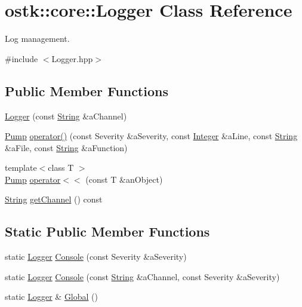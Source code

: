 \hypertarget{classostk_1_1core_1_1_logger}{}\section{ostk\+:\+:core\+:\+:Logger Class Reference}
\label{classostk_1_1core_1_1_logger}


Log management.  




{\ttfamily \#include $<$Logger.\+hpp$>$}

\subsection*{Public Member Functions}
\begin{DoxyCompactItemize}
\item 
\hyperlink{classostk_1_1core_1_1_logger_afc4760c6468b14aa75abec4624dfd7ea}{Logger} (const \hyperlink{classostk_1_1core_1_1types_1_1_string}{String} \&a\+Channel)
\item 
\hyperlink{classostk_1_1core_1_1logger_1_1_pump}{Pump} \hyperlink{classostk_1_1core_1_1_logger_a7d8033ccf22cdd2e2ba642517dada6d3}{operator()} (const Severity \&a\+Severity, const \hyperlink{classostk_1_1core_1_1types_1_1_integer}{Integer} \&a\+Line, const \hyperlink{classostk_1_1core_1_1types_1_1_string}{String} \&a\+File, const \hyperlink{classostk_1_1core_1_1types_1_1_string}{String} \&a\+Function)
\item 
{\footnotesize template$<$class T $>$ }\\\hyperlink{classostk_1_1core_1_1logger_1_1_pump}{Pump} \hyperlink{classostk_1_1core_1_1_logger_a546b882e7f79c120869d64221b0d554a}{operator$<$$<$} (const T \&an\+Object)
\item 
\hyperlink{classostk_1_1core_1_1types_1_1_string}{String} \hyperlink{classostk_1_1core_1_1_logger_a4691c53452220b6830fa566ce1c15605}{get\+Channel} () const
\end{DoxyCompactItemize}
\subsection*{Static Public Member Functions}
\begin{DoxyCompactItemize}
\item 
static \hyperlink{classostk_1_1core_1_1_logger}{Logger} \hyperlink{classostk_1_1core_1_1_logger_a1aeb05d2b956ccacf4c8cd5942ba8501}{Console} (const Severity \&a\+Severity)
\item 
static \hyperlink{classostk_1_1core_1_1_logger}{Logger} \hyperlink{classostk_1_1core_1_1_logger_a37f1934e129df80b75bffa2cf7255ff0}{Console} (const \hyperlink{classostk_1_1core_1_1types_1_1_string}{String} \&a\+Channel, const Severity \&a\+Severity)
\item 
static \hyperlink{classostk_1_1core_1_1_logger}{Logger} \& \hyperlink{classostk_1_1core_1_1_logger_a183e8665ded1dcadb11ed138879f034b}{Global} ()
\end{DoxyCompactItemize}


